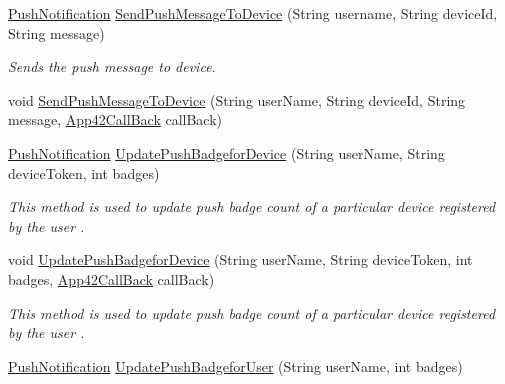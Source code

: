 \begin{DoxyCompactItemize}
\item 
\hyperlink{classcom_1_1shephertz_1_1app42_1_1paas_1_1sdk_1_1csharp_1_1push_notification_1_1_push_notification}{Push\+Notification} \hyperlink{classcom_1_1shephertz_1_1app42_1_1paas_1_1sdk_1_1csharp_1_1push_notification_1_1_push_notification_service_aa592c5bf5e7c49f2d41d7cb12cbf8cce}{Send\+Push\+Message\+To\+Device} (String username, String device\+Id, String message)
\begin{DoxyCompactList}\small\item\em Sends the push message to device. \end{DoxyCompactList}\item 
void \hyperlink{classcom_1_1shephertz_1_1app42_1_1paas_1_1sdk_1_1csharp_1_1push_notification_1_1_push_notification_service_ab70a7beffeb9d68765de20cdb15ee5cb}{Send\+Push\+Message\+To\+Device} (String user\+Name, String device\+Id, String message, \hyperlink{interfacecom_1_1shephertz_1_1app42_1_1paas_1_1sdk_1_1csharp_1_1_app42_call_back}{App42\+Call\+Back} call\+Back)
\item 
\hyperlink{classcom_1_1shephertz_1_1app42_1_1paas_1_1sdk_1_1csharp_1_1push_notification_1_1_push_notification}{Push\+Notification} \hyperlink{classcom_1_1shephertz_1_1app42_1_1paas_1_1sdk_1_1csharp_1_1push_notification_1_1_push_notification_service_a6da61bd90d681850ec761c8c82bd6b7b}{Update\+Push\+Badgefor\+Device} (String user\+Name, String device\+Token, int badges)
\begin{DoxyCompactList}\small\item\em This method is used to update push badge count of a particular device registered by the user . \end{DoxyCompactList}\item 
void \hyperlink{classcom_1_1shephertz_1_1app42_1_1paas_1_1sdk_1_1csharp_1_1push_notification_1_1_push_notification_service_a84c4b14728fdced582417a5a2ad96bb3}{Update\+Push\+Badgefor\+Device} (String user\+Name, String device\+Token, int badges, \hyperlink{interfacecom_1_1shephertz_1_1app42_1_1paas_1_1sdk_1_1csharp_1_1_app42_call_back}{App42\+Call\+Back} call\+Back)
\begin{DoxyCompactList}\small\item\em This method is used to update push badge count of a particular device registered by the user . \end{DoxyCompactList}\item 
\hyperlink{classcom_1_1shephertz_1_1app42_1_1paas_1_1sdk_1_1csharp_1_1push_notification_1_1_push_notification}{Push\+Notification} \hyperlink{classcom_1_1shephertz_1_1app42_1_1paas_1_1sdk_1_1csharp_1_1push_notification_1_1_push_notification_service_a0b9038adc9ca71fe45f5e271a0abeae6}{Update\+Push\+Badgefor\+User} (String user\+Name, int badges)

\end{DoxyCompactItemize}

